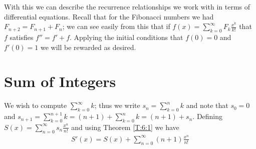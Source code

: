 \documentclass[oneside,12pt]{book}   	%
\theoremstyle{definition}
\begin{document}
\begin{spacing}{1.618}
			With this we can describe the recurrence relationships we work with in terms of differential equations. Recall that for the Fibonacci numbers we had $F_{n+2}=F_{n+1}+F_n$; we can see easily from this that if $f(x)=\sum_{k=0}^\infty F_k \frac{x^k}{k!}$ that $f$ satisfies $f''=f'+f$. Applying the initial conditions that $f(0)=0$ and $f'(0)=1$ we will be rewarded as desired. 
			
		\section{Sum of Integers}\label{S:6:3}
		
			We wish to compute $\sum_{k=0}^\infty k$; thus we write $s_n=\sum_{k=0}^n k$ and note that $s_0=0$ and $s_{n+1}=\sum_{k=0}^{n+1} k = (n+1)+\sum_{k=0}^n k=(n+1)+s_n$. Defining $S(x)=\sum_{n=0}^\infty s_n \frac{x^n}{n!}$ and  using Theorem \ref{T:6:1} we have 
			\begin{alignat}{4}
				S'(x)=S(x)+\sum_{n=0}^\infty (n+1)\frac{x^n}{n!} \label{E:6:2}
			\end{alignat}
	

\end{spacing}
\end{document}
